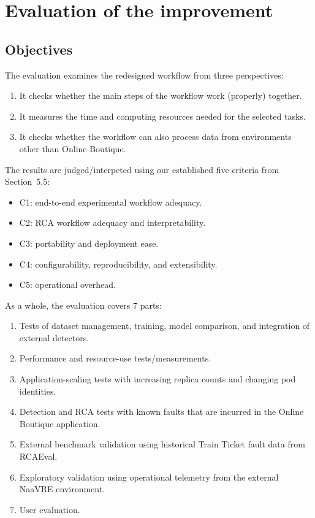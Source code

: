 \section{Evaluation of the improvement}
\label{sec:improvement-evaluation}

\subsection{Objectives}

The evaluation examines the redesigned workflow from three perspectives:
\begin{enumerate}
    \item It checks whether the main steps of the workflow work (properly) together.
    \item It measures the time and computing resources needed for the selected tasks.
    \item It checks whether the workflow can also process data from environments other than Online Boutique.
\end{enumerate}

The results are judged/interpeted using our established five criteria from Section~5.5:
\begin{itemize}
    \item C1: end-to-end experimental workflow adequacy.
    \item C2: RCA workflow adequacy and interpretability.
    \item C3: portability and deployment ease.
    \item C4: configurability, reproducibility, and extensibility.
    \item C5: operational overhead.
\end{itemize}

As a whole, the evaluation covers 7 parts:
\begin{enumerate}
    \item Tests of dataset management, training, model comparison, and integration of external detectors.
    \item Performance and resource-use tests/measurements.
    \item Application-scaling tests with increasing replica counts and changing pod identities.
    \item Detection and RCA tests with known faults that are incurred in the Online Boutique application.
    \item External benchmark validation using historical Train Ticket fault data from RCAEval.
    \item Exploratory validation using operational telemetry from the external NaaVRE environment.
    \item User evaluation.
\end{enumerate}

